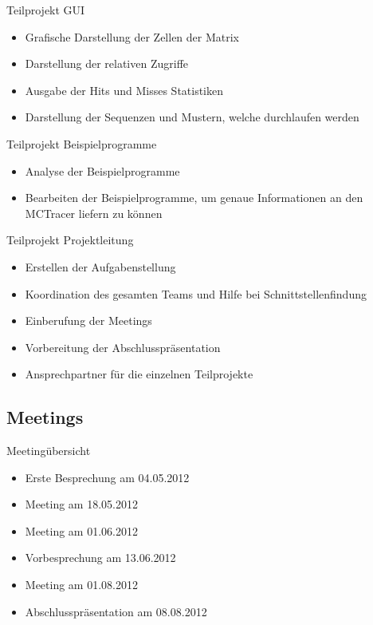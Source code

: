 \begin{frame}
\begin{block}{Teilprojekt GUI}
\begin{itemize}[<+->]
\pause\item Grafische Darstellung der Zellen der Matrix
\item Darstellung der relativen Zugriffe
\item Ausgabe der Hits und Misses Statistiken
\item Darstellung der Sequenzen und Mustern, welche durchlaufen werden
\end{itemize}
\end{block}
\end{frame}

\begin{frame}
\begin{block}{Teilprojekt Beispielprogramme}
\begin{itemize}[<+->]
\pause\item Analyse der Beispielprogramme
\item Bearbeiten der Beispielprogramme, um genaue Informationen an den MCTracer liefern zu können
\end{itemize}
\end{block}
\end{frame}

\begin{frame}
\begin{block}{Teilprojekt Projektleitung}
\begin{itemize}[<+->]
\pause\item Erstellen der Aufgabenstellung
\item Koordination des gesamten Teams und Hilfe bei Schnittstellenfindung
\item Einberufung der Meetings
\item Vorbereitung der Abschlusspräsentation
\item Ansprechpartner für die einzelnen Teilprojekte
\end{itemize}
\end{block}
\end{frame}

\subsection{Meetings}

\begin{frame}
\begin{block}{Meetingübersicht}
\begin{itemize}[<+->]
\pause\item Erste Besprechung am 04.05.2012
\item Meeting am 18.05.2012
\item Meeting am 01.06.2012
\item Vorbesprechung am 13.06.2012
\item Meeting am 01.08.2012
\item Abschlusspräsentation am 08.08.2012
\end{itemize}
\end{block}
\end{frame}

